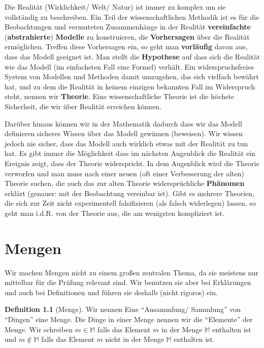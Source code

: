 \documentclass[a4paper]{book}%
\theoremstyle{definition}
\newtheorem{definition}{Definition}
\begin{document}
Die Realität (Wirklichkeit/ Welt/ Natur) ist immer zu komplex um sie vollständig zu beschreiben. Ein Teil der wissenschaftlichen Methodik ist es für die Beobachtungen und vermuteten Zusammenhänge in der Realität \textbf{vereinfachte} (\textbf{abstrahierte}) \textbf{Modelle} zu konstruieren, die \textbf{Vorhersagen} über die Realität ermöglichen. Treffen diese Vorhersagen ein, so geht man \textbf{vorläufig} davon aus, dass das Modell geeignet ist. Man stellt die \textbf{Hypothese} auf dass sich die Realität wie das Modell (im einfachsten Fall eine Formel) verhält. Ein widerspruchsfreies System von Modellen und Methoden damit umzugehen, das sich vielfach bewährt hat, und zu dem die Realität in keinem einzigen bekannten Fall im Widerspruch steht, nennen wir \textbf{Theorie}. Eine wissenschaftliche Theorie ist die höchste Sicherheit, die wir über Realität erreichen können.

Darüber hinaus können wir in der Mathematik dadurch dass wir das Modell definieren sicheres Wissen über das Modell gewinnen (beweisen). Wir wissen jedoch nie sicher, dass das Modell auch wirklich etwas mit der Realität zu tun hat. Es gibt immer die Möglichkeit dass im nächsten Augenblick die Realität ein Ereignis zeigt, dass der Theorie widerspricht. In dem Augenblick wird die Theorie verworfen und man muss nach einer neuen (oft einer Verbesserung der alten) Theorie suchen, die auch das zur alten Theorie widersprüchliche \textbf{Phänomen} erklärt (genauer: mit der Beobachtung vereinbar ist). Gibt es mehrere Theorien, die sich zur Zeit nicht experimentell falsifizieren (als falsch widerlegen) lassen, so geht man i.d.R. von der Theorie aus, die am wenigsten kompliziert ist.


\chapter{Mengen}

Wir machen Mengen nicht zu einem großen zentralen Thema, da sie meistens nur mittelbar für die Prüfung relevant sind. Wir benutzen sie aber bei Erklärungen und auch bei Definitionen und führen sie deshalb (nicht rigoros) ein.

\begin{definition}[Menge]
    Wir nennen Eine \enquote{Ansammlung/ Sammlung} von \enquote{Dingen} eine Menge. Die Dinge in einer Menge nennen wir die \enquote{Elemente} der Menge. Wir schreiben $m \in \mathbb{M}$ falls das Element $m$ in der Menge $\mathbb{M}$ enthalten ist und $m \notin \mathbb{M}$ falls das Element $m$ nicht in der Menge $\mathbb{M}$ enthalten ist.
\end{definition}
\end{document}
